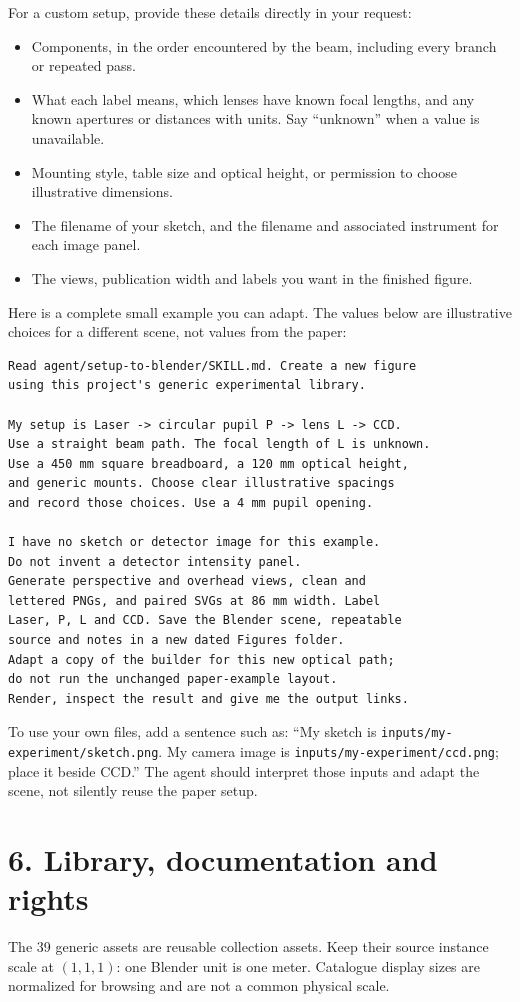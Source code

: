 \documentclass[11pt,a4paper]{article}
\begin{document}
For a custom setup, provide these details directly in your request:
\begin{itemize}[leftmargin=*]
\item Components, in the order encountered by the beam, including every branch or repeated pass.
\item What each label means, which lenses have known focal lengths, and any known apertures or distances with units. Say ``unknown'' when a value is unavailable.
\item Mounting style, table size and optical height, or permission to choose illustrative dimensions.
\item The filename of your sketch, and the filename and associated instrument for each image panel.
\item The views, publication width and labels you want in the finished figure.
\end{itemize}
Here is a complete small example you can adapt. The values below are illustrative choices for a different scene, not values from the paper:
\begin{Verbatim}[fontsize=\small]
Read agent/setup-to-blender/SKILL.md. Create a new figure
using this project's generic experimental library.

My setup is Laser -> circular pupil P -> lens L -> CCD.
Use a straight beam path. The focal length of L is unknown.
Use a 450 mm square breadboard, a 120 mm optical height,
and generic mounts. Choose clear illustrative spacings
and record those choices. Use a 4 mm pupil opening.

I have no sketch or detector image for this example.
Do not invent a detector intensity panel.
Generate perspective and overhead views, clean and
lettered PNGs, and paired SVGs at 86 mm width. Label
Laser, P, L and CCD. Save the Blender scene, repeatable
source and notes in a new dated Figures folder.
Adapt a copy of the builder for this new optical path;
do not run the unchanged paper-example layout.
Render, inspect the result and give me the output links.
\end{Verbatim}
To use your own files, add a sentence such as: ``My sketch is \texttt{inputs/my-experiment/sketch.png}. My camera image is \texttt{inputs/my-experiment/ccd.png}; place it beside CCD.'' The agent should interpret those inputs and adapt the scene, not silently reuse the paper setup.

\section*{6. Library, documentation and rights}
The 39 generic assets are reusable collection assets. Keep their source instance scale at $(1,1,1)$: one Blender unit is one meter. Catalogue display sizes are normalized for browsing and are not a common physical scale.
\end{document}
